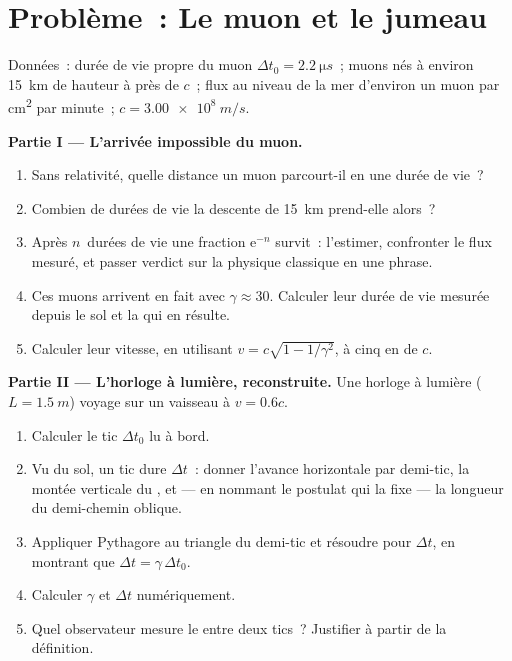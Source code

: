 \section{Problème~: Le muon et le jumeau}

\begin{problem}
\label{pb:g12:special-relativity:1}
Données~: durée de vie propre du muon $\Delta t_0 = \qty{2.2}{\micro s}$~;
muons nés à environ \qty{15}{km} de hauteur à près de $c$~; flux au
niveau de la mer d'environ un muon par \unit{cm^2} par minute~;
$c = \qty{3.00e8}{m/s}$.

\medskip
\noindent\textbf{Partie I --- L'arrivée impossible du muon.}
\begin{enumerate}
  \item Sans relativité, quelle distance un muon parcourt-il en une
        durée de vie~?
  \item Combien de durées de vie la descente de \qty{15}{km} prend-elle
        alors~?
  \item Après $n$~durées de vie une fraction $\mathrm{e}^{-n}$
        survit~: l'estimer, confronter le flux mesuré, et passer
        verdict sur la physique classique en une phrase.
  \item Ces muons arrivent en fait avec $\gamma \approx 30$. Calculer
        leur durée de vie mesurée depuis le sol et la
         qui en résulte.
  \item Calculer leur vitesse, en utilisant
        $v = c\sqrt{1 - 1/\gamma^2}$, à cinq
         en
         de $c$.
\end{enumerate}

\medskip
\noindent\textbf{Partie II --- L'horloge à lumière, reconstruite.}
Une horloge à lumière ($L = \qty{1.5}{m}$) voyage sur un vaisseau à
$v = 0.6c$.
\begin{enumerate}[resume]
  \item Calculer le tic $\Delta t_0$ lu à bord.
  \item Vu du sol, un tic dure $\Delta t$~: donner l'avance horizontale
        par demi-tic, la montée verticale du
        , et --- en nommant le postulat qui la
        fixe --- la longueur du demi-chemin oblique.
  \item Appliquer Pythagore au triangle du demi-tic et résoudre pour
        $\Delta t$, en montrant que $\Delta t = \gamma\,\Delta t_0$.
  \item Calculer $\gamma$ et $\Delta t$ numériquement.
  \item Quel observateur mesure le
         entre deux tics~?
        Justifier à partir de la définition.
\end{enumerate}


\end{problem}
